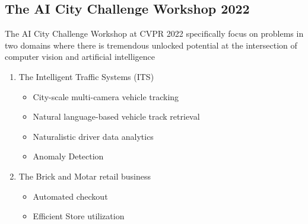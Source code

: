 \subsection*{The AI City Challenge Workshop 2022}
The AI City Challenge Workshop at CVPR 2022 specifically focus on problems in two domains where there is tremendous unlocked potential at the intersection of computer vision and artificial intelligence
\begin{enumerate}
	\item The Intelligent Traffic Systems (ITS)
	\begin{itemize}
		\item City-scale multi-camera vehicle tracking
		\item Natural language-based vehicle track retrieval
		\item Naturalistic driver data analytics
		\item Anomaly Detection
	\end{itemize}
	\item The Brick and Motar retail business
	\begin{itemize}
		\item Automated checkout
		\item Efficient Store utilization
	\end{itemize}
\end{enumerate}

